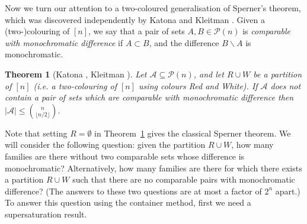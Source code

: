 \documentclass[11pt]{article}
\newtheorem{thm}[theorem]{Theorem}
\numberwithin{equation}{section}
\begin{document}
Now we turn our attention to a two-coloured generalisation of Sperner's theorem, which was discovered independently by Katona \cite{katonaspernergener} and Kleitman \cite{kleitmanspernergener}. Given a (two-)colouring of $[n]$, we say that a pair of sets $A,B\in\mathcal{P}(n)$ is \emph{comparable with monochromatic difference} if $A\subset B$, and the difference $B\backslash A$ is monochromatic.

\begin{thm}[Katona \cite{katonaspernergener}, Kleitman \cite{kleitmanspernergener}]\label{generalisedspernerthm}
Let $\mathcal{A}\subseteq \mathcal{P}(n)$, and let $R\cup W$ be a partition of $[n]$ (i.e. a two-colouring of $[n]$ using colours Red and White). If $\mathcal{A}$ does not contain a pair of sets which are comparable with monochromatic difference then $|\mathcal{A}|\leq \binom{n}{\lfloor n/2\rfloor}$. 
\end{thm}

Note that setting $R=\emptyset$ in Theorem~\ref{generalisedspernerthm} gives the classical Sperner theorem. We will consider  the following question: given the partition $R\cup W$, how many families are there without two comparable sets whose difference is monochromatic? Alternatively, how many families are there for which there exists a partition $R\cup W$ such that there are no comparable pairs with monochromatic difference? (The answers to these two questions are at most a factor of $2^n$ apart.) To answer this question using the container method, first we need a supersaturation result.
\end{document}
